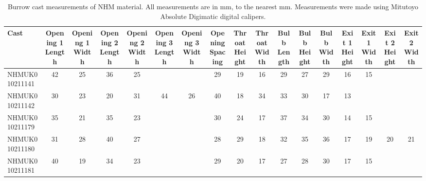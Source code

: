 \documentclass{article}
\begin{document}
   \begin{landscape}
   		\thispagestyle{plain}
	   	\begin{table}
	   		\tiny
   		\begin{tabular}{|l|c|c|c|c|c|c|c|c|c|c|c|c|c|c|c|c|}
   			\hline 	Cast &
		   			\makecell{Opening 1\\Length} &
		   			\makecell{Opening 1\\Width} &
		   			\makecell{Opening 2\\Length} &
		   			\makecell{Opening 2\\Width} &
		   			\makecell{Opening 3\\Length} &
		   			\makecell{Opening 3\\Width} &
		   			\makecell{Opening\\Spacing} &
		   			\makecell{Throat\\Height} &
		   			\makecell{Throat\\Width} &
		   			\makecell{Bulb\\Length} & 
		   			\makecell{Bulb\\Height} &
		   			\makecell{Bulb\\Width} &
		   			\makecell{Exit 1\\Height} &
		   			\makecell{Exit 1\\Width} &
		   			\makecell{Exit 2\\Height} &
		   			\makecell{Exit 2\\Width} \\
		   	\hline	NHMUK010211141 &
				   	42 &
				   	25 &
				   	36 &
				   	25 &
				   	&
				   	&
				   	29 &
				   	19 &
				   	16 &
				   	29 &
				   	27 &
				   	29 &
				   	16 &
				   	15 &
				   	&
				   	\\
				   	
			\hline	NHMUK010211142 &
					30 &
					23 &
					20 &
					31 &
					44 &
					26 &
					40 &
					18 &
					34 &
					33 &
					30 &
					17 &
					13 &
					&
					&
					\\
					
		   	\hline	NHMUK010211179 &
				   	35 &
				   	21 &
				   	35 &
				   	23 &
				   	&
				   	&
				   	30 &
				   	24 &
				   	17 &
				   	37 &
				   	34 &
				   	30 &
				   	14 &
				   	15 &&\\
		   	\hline	NHMUK010211180 &
				   	31 &
				   	28 &
				   	40 &
				   	27 &
				   	&
				   	&
				   	28 &
				   	29 &
				   	18 &
				   	32 &
				   	35 &
				   	36 &
				   	17 &
				   	19 &
				   	20 &
				   	21 \\
			\hline	NHMUK010211181 &
					40 &
					19 &
					34 &
					23 &
					&
					&
					29 &
					20 &
					17 &
					27 &
					28 &
					30 &
					17 &
					15 &&\\
			
			\hline
				   	
   		\end{tabular}
   		\caption{Burrow cast measurements of NHM material. All measurements are in mm, to the nearest mm. Measurements were made using Mitutoyo Absolute Digimatic digital calipers.}
   		\label{tab:measurements}
	   	\end{table}
   	\end{landscape}
   	
\end{document}
